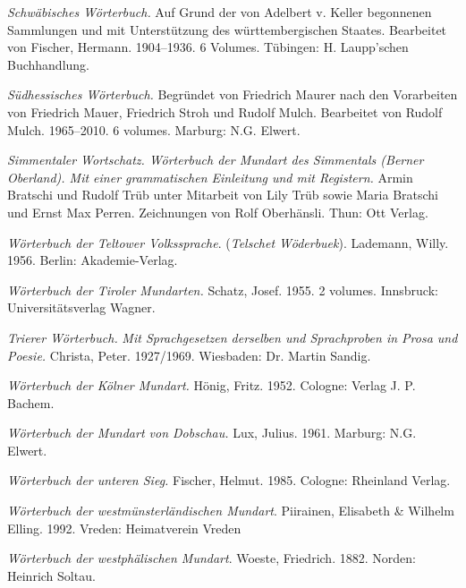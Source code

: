 \begin{description}[font=\normalfont]
\item[SchwWb:]  \textit{Schwäbisches Wörterbuch.} Auf Grund der von Adelbert v. Keller begonnenen Sammlungen und mit Unterstützung des württembergischen Staates. Bearbeitet von Fischer, Hermann. 1904–1936. 6 Volumes. Tübingen: H. Laupp’schen Buchhandlung.
\item[SHesWb:] \textit{Südhessisches Wörterbuch.} Begründet von Friedrich Maurer nach den Vorarbeiten von Friedrich Mauer, Friedrich Stroh und Rudolf Mulch. Bearbeitet von Rudolf Mulch. 1965--2010. 6 volumes. Marburg: N.G. Elwert.
\item[SiWS:] \textit{Simmentaler Wortschatz. Wörterbuch der Mundart des Simmentals (Berner Oberland). Mit einer grammatischen Einleitung und mit Registern.} Armin Bratschi und Rudolf Trüb unter Mitarbeit von Lily Trüb sowie Maria Bratschi und Ernst Max Perren. Zeichnungen von Rolf Oberhänsli. Thun: Ott Verlag.
\item[TeWb:]  \textit{Wörterbuch der Teltower Volkssprache}. (\textit{Telschet Wöderbuek}). Lademann, Willy. 1956. Berlin: Akademie-Verlag.
\item[TiWb:] \textit{Wörterbuch der Tiroler Mundarten.} Schatz, Josef. 1955. 2 volumes. Innsbruck: Universitätsverlag Wagner.
\item[TrWb:] \textit{Trierer Wörterbuch.} \textit{Mit Sprachgesetzen derselben und Sprachproben in Prosa und Poesie.} Christa, Peter. 1927/1969. Wiesbaden: Dr. Martin Sandig.
\item[WbKM:]  \textit{Wörterbuch der Kölner Mundart.} Hönig, Fritz. 1952. Cologne: Verlag J. P. Bachem.
\item[WbMD:]  \textit{Wörterbuch der Mundart von Dobschau.} Lux, Julius. 1961. Marburg: N.G. Elwert.
\item[WbUS:]  \textit{Wörterbuch der unteren Sieg.} Fischer, Helmut. 1985. Cologne: Rheinland Verlag.
\item[WMlWb:] \textit{Wörterbuch der westmünsterländischen Mundart}. Piirainen, Elisabeth \& Wilhelm Elling. 1992. Vreden: Heimatverein Vreden
\item[WphWb:] \textit{Wörterbuch der westphälischen Mundart}. Woeste, Friedrich. 1882. Norden: Heinrich Soltau.
\end{description}

